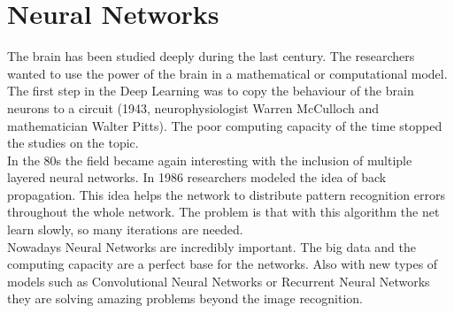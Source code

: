 \chapter{Neural Networks}
The brain has been studied deeply during the last century. The researchers wanted to use the power of the brain in a mathematical or computational model. The first step in the Deep Learning was to copy the behaviour of the brain neurons to a circuit (1943, neurophysiologist Warren McCulloch and mathematician Walter Pitts). The poor computing capacity of the time stopped the studies on the topic.\\

In the 80s the field became again interesting with the inclusion of multiple layered neural networks. In 1986 researchers modeled the idea of back propagation. This idea helps the network to distribute pattern recognition errors throughout the whole network. The problem is that with this algorithm the net learn slowly, so many iterations are needed. \\

Nowadays Neural Networks are incredibly important. The big data and the computing capacity are a perfect base for the networks. Also with new types of models such as Convolutional Neural Networks or Recurrent Neural Networks they are solving amazing problems beyond the image recognition. \cite{hnet1} \cite{hnet2}




